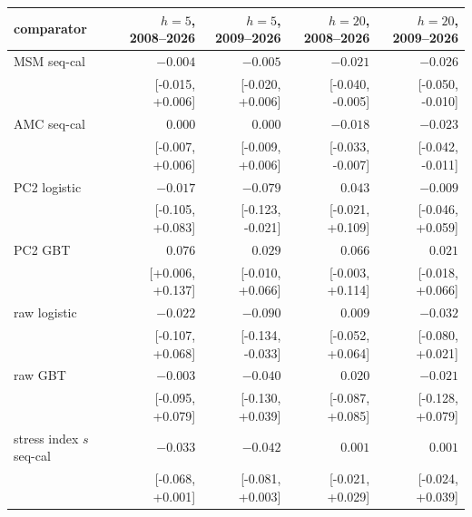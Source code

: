 \begin{tabular}{lrrrr}\toprule
comparator & $h=5$, 2008--2026 & $h=5$, 2009--2026 & $h=20$, 2008--2026 & $h=20$, 2009--2026\\\midrule
MSM seq-cal & $-0.004$ & $-0.005$ & $-0.021$ & $-0.026$\\
 & {\scriptsize[-0.015, +0.006]} & {\scriptsize[-0.020, +0.006]} & {\scriptsize[-0.040, -0.005]} & {\scriptsize[-0.050, -0.010]}\\
AMC seq-cal & $0.000$ & $0.000$ & $-0.018$ & $-0.023$\\
 & {\scriptsize[-0.007, +0.006]} & {\scriptsize[-0.009, +0.006]} & {\scriptsize[-0.033, -0.007]} & {\scriptsize[-0.042, -0.011]}\\
PC2 logistic & $-0.017$ & $-0.079$ & $0.043$ & $-0.009$\\
 & {\scriptsize[-0.105, +0.083]} & {\scriptsize[-0.123, -0.021]} & {\scriptsize[-0.021, +0.109]} & {\scriptsize[-0.046, +0.059]}\\
PC2 GBT & $0.076$ & $0.029$ & $0.066$ & $0.021$\\
 & {\scriptsize[+0.006, +0.137]} & {\scriptsize[-0.010, +0.066]} & {\scriptsize[-0.003, +0.114]} & {\scriptsize[-0.018, +0.066]}\\
raw logistic & $-0.022$ & $-0.090$ & $0.009$ & $-0.032$\\
 & {\scriptsize[-0.107, +0.068]} & {\scriptsize[-0.134, -0.033]} & {\scriptsize[-0.052, +0.064]} & {\scriptsize[-0.080, +0.021]}\\
raw GBT & $-0.003$ & $-0.040$ & $0.020$ & $-0.021$\\
 & {\scriptsize[-0.095, +0.079]} & {\scriptsize[-0.130, +0.039]} & {\scriptsize[-0.087, +0.085]} & {\scriptsize[-0.128, +0.079]}\\
stress index $s$ seq-cal & $-0.033$ & $-0.042$ & $0.001$ & $0.001$\\
 & {\scriptsize[-0.068, +0.001]} & {\scriptsize[-0.081, +0.003]} & {\scriptsize[-0.021, +0.029]} & {\scriptsize[-0.024, +0.039]}\\
\bottomrule\end{tabular}
